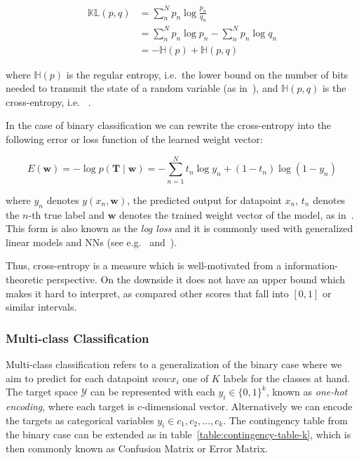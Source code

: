 \begin{equation}
  \begin{split}
  \mathbb{KL}(p,q) &= \sum_n^N p_n \log \frac{p_n}{q_n} \\
  &= \sum_n^N p_n \log p_n - \sum_n^N p_n \log q_n \\
  &= - \mathbb{H}(p) + \mathbb{H}(p,q)
\end{split}
\end{equation}

where $\mathbb{H}(p)$ is the regular entropy, i.e.\ the lower bound on the number of bits needed to transmit the state of a random variable (as in~\cite{Shannon:2001aa}), and $\mathbb{H}(p,q)$ is the cross-entropy, i.e. ~\cite[Chapter 2.8.2, p.~57]{Murphy:2012aa}.

In the case of binary classification we can rewrite the cross-entropy into the following error or loss function of the learned weight vector:

\begin{equation}
  E(\mathbf{w}) =  -\log p(\mathbf{T} \mid \mathbf{w}) = - \sum_{n=1}^N {t_n \log y_n + (1 - t_n) \log (1 - y_n)}
\end{equation}

where $y_n$ denotes $y(x_n, \mathbf{w})$, the predicted output for datapoint $x_n$, $t_n$ denotes the $n$-th true label and $\mathbf{w}$ denotes the trained weight vector of the model, as in~\cite[Chapter 4.3.2, p.~205 ]{Bishop:2006aa}. This form is also known as the \emph{log loss} and it is commonly used with generalized linear models and \glspl{NN} (see e.g.~\cite[Chapter 4.3.2, p.~205 ]{Bishop:2006aa} and~\cite[Chapter 10.7, p.~251 ]{Alpaydin:2014aa}).

Thus, cross-entropy is a measure which is well-motivated from a information-theoretic perspective. On the downside it does not have an upper bound which makes it hard to interpret, as compared other scores that fall into $[0, 1]$ or similar intervals.

\subsubsection*{Multi-class Classification}
\label{subs:Multi-class Classification}

Multi-class classification refers to a generalization of the binary case where we aim to predict for each datapoint $wowx_i$ one of $K$ labels for the classes at hand. The target space $\mathcal{Y}$ can be represented with each $y_i \in \{ 0,1 \}^k$, known as \emph{one-hot encoding}, where each target is $c$-dimensional vector. Alternatively we can encode the targets as categorical variables $y_i \in {c_1, c_2, \ldots, c_k}$. The contingency table from the binary case can be extended as in table~\ref{table:contingency-table-k}, which is then commonly known as
\gls{Confusion Matrix} or \gls{Error Matrix}.

